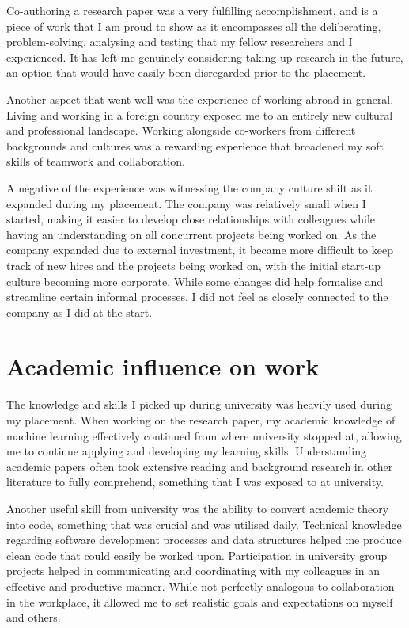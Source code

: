 Co-authoring a research paper was a very fulfilling accomplishment, and is a piece of work that I am
proud to show as it encompasses all the deliberating, problem-solving, analysing and testing that my
fellow researchers and I experienced. It has left me genuinely considering taking up research in the
future, an option that would have easily been disregarded prior to the placement.

Another aspect that went well was the experience of working abroad in general. Living and working in
a foreign country exposed me to an entirely new cultural and professional landscape. Working
alongside co-workers from different backgrounds and cultures was a rewarding experience that
broadened my soft skills of teamwork and collaboration.

A negative of the experience was witnessing the company culture shift as it expanded during my
placement. The company was relatively small when I started, making it easier to develop close
relationships with colleagues while having an understanding on all concurrent projects being worked
on. As the company expanded due to external investment, it became more difficult to keep track of
new hires and the projects being worked on, with the initial start-up culture becoming more
corporate. While some changes did help formalise and streamline certain informal processes, I did
not feel as closely connected to the company as I did at the start.

\section{Academic influence on work}

The knowledge and skills I picked up during university was heavily used during my placement. When
working on the research paper, my academic knowledge of machine learning effectively continued from
where university stopped at, allowing me to continue applying and developing my learning skills.
Understanding academic papers often took extensive reading and background research in other
literature to fully comprehend, something that I was exposed to at university.

Another useful skill from university was the ability to convert academic theory into code, something
that was crucial and was utilised daily. Technical knowledge regarding software development
processes and data structures helped me produce clean code that could easily be worked upon.
Participation in university group projects helped in communicating and coordinating with my
colleagues in an effective and productive manner. While not perfectly analogous to collaboration in
the workplace, it allowed me to set realistic goals and expectations on myself and others.

